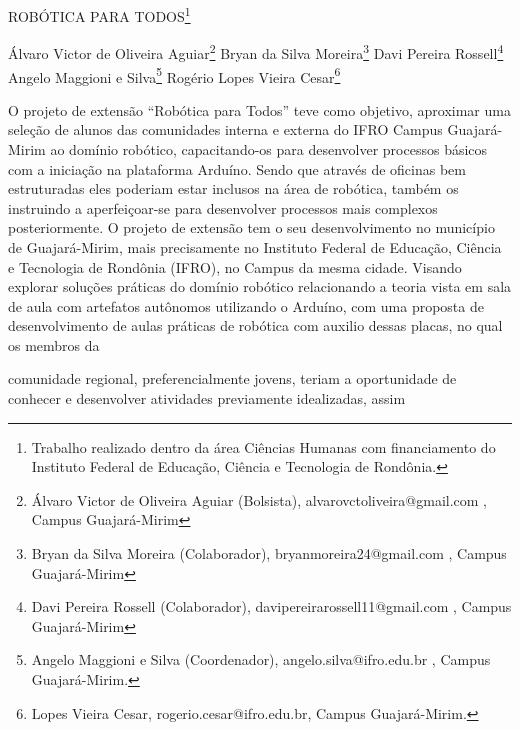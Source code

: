 \documentclass[article,12pt,onesidea,4paper,english,brazil]{abntex2}
\begin{document}
	
	
	\frenchspacing 
	
	\begin{center}
		\LARGE ROBÓTICA PARA TODOS\footnote{Trabalho realizado dentro da área Ciências Humanas com financiamento do Instituto Federal de Educação, Ciência e Tecnologia de Rondônia.}
		
		\normalsize
		Álvaro Victor de Oliveira Aguiar\footnote{Álvaro Victor de Oliveira Aguiar (Bolsista), alvarovctoliveira@gmail.com , Campus Guajará-Mirim} 
		Bryan da Silva Moreira\footnote{Bryan da Silva Moreira (Colaborador), bryanmoreira24@gmail.com , Campus Guajará-Mirim} 
		Davi Pereira Rossell\footnote{Davi Pereira Rossell (Colaborador), davipereirarossell11@gmail.com , Campus Guajará-Mirim} 
		Angelo Maggioni e Silva\footnote{Angelo Maggioni e Silva (Coordenador), angelo.silva@ifro.edu.br , Campus Guajará-Mirim.}
		Rogério Lopes Vieira Cesar\footnote{Lopes Vieira Cesar, rogerio.cesar@ifro.edu.br, Campus Guajará-Mirim.} 
	\end{center}
	
	\noindent O projeto de extensão “Robótica para Todos” teve como objetivo, aproximar uma seleção de alunos das comunidades interna e externa do IFRO Campus Guajará-Mirim ao domínio robótico, capacitando-os para desenvolver processos básicos com a iniciação na plataforma Arduíno. Sendo que através de oficinas bem estruturadas eles poderiam estar inclusos na área de robótica, também os instruindo a aperfeiçoar-se para desenvolver processos mais complexos posteriormente. O projeto de extensão tem o seu desenvolvimento no município de Guajará-Mirim, mais precisamente no Instituto Federal de Educação, Ciência e Tecnologia de Rondônia (IFRO), no Campus da mesma cidade. Visando explorar soluções práticas do domínio robótico relacionando a teoria vista em sala de aula com artefatos autônomos utilizando o Arduíno, com uma proposta de desenvolvimento de aulas práticas de robótica com auxilio dessas placas, no qual os membros da
	
	comunidade regional,   preferencialmente	jovens,   teriam a   oportunidade   de
	conhecer	e desenvolver	atividades	previamente	idealizadas,	assim
	
\end{document}
